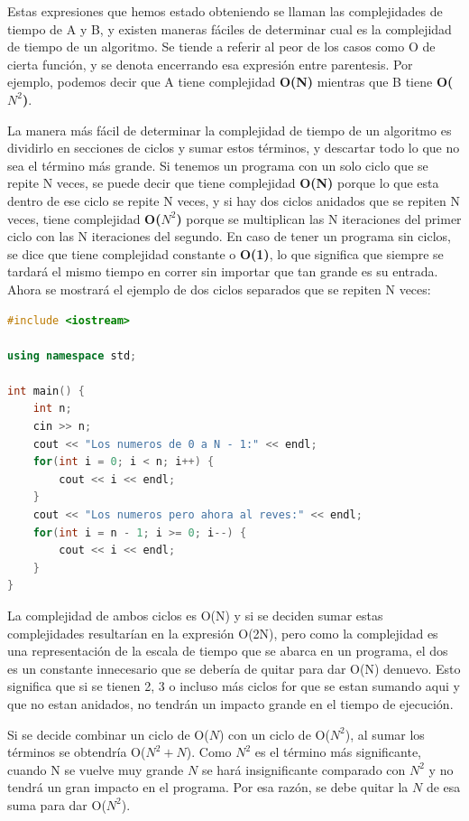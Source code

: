 \documentclass{article}
\begin{document}
Estas expresiones que hemos estado obteniendo se llaman las complejidades de tiempo de A y B, y existen maneras fáciles de determinar cual es la complejidad de tiempo de un algoritmo. Se tiende a referir al peor de los casos como O de cierta función, y se denota encerrando esa expresión entre parentesis. Por ejemplo, podemos decir que A tiene complejidad \textbf{O(N)} mientras que B tiene \textbf{O($N^2$)}.

La manera más fácil de determinar la complejidad de tiempo de un algoritmo es dividirlo en secciones de ciclos y sumar estos términos, y descartar todo lo que no sea el término más grande. Si tenemos un programa con un solo ciclo que se repite N veces, se puede decir que tiene complejidad \textbf{O(N)} porque lo que esta dentro de ese ciclo se repite N veces, y si hay dos ciclos anidados que se repiten N veces, tiene complejidad \textbf{O($N^2$)} porque se multiplican las N iteraciones del primer ciclo con las N iteraciones del segundo. En caso de tener un programa sin ciclos, se dice que tiene complejidad constante o \textbf{O(1)}, lo que significa que siempre se tardará el mismo tiempo en correr sin importar que tan grande es su entrada. Ahora se mostrará el ejemplo de dos ciclos separados que se repiten N veces:

\begin{lstlisting}[language=C++, title=Encontrando primos menores que N]
#include <iostream>

using namespace std;

int main() {
	int n;
	cin >> n;
	cout << "Los numeros de 0 a N - 1:" << endl;
	for(int i = 0; i < n; i++) {
		cout << i << endl;
	}
	cout << "Los numeros pero ahora al reves:" << endl;
	for(int i = n - 1; i >= 0; i--) {
		cout << i << endl;
	}
}
\end{lstlisting}

La complejidad de ambos ciclos es O(N) y si se deciden sumar estas complejidades resultarían en la expresión O(2N), pero como la complejidad es una representación de la escala de tiempo que se abarca en un programa, el dos es un constante innecesario que se debería de quitar para dar O(N) denuevo. Esto significa que si se tienen 2, 3 o incluso más ciclos for que se estan sumando aqui y que no estan anidados, no tendrán un impacto grande en el tiempo de ejecución.

Si se decide combinar un ciclo de O($N$) con un ciclo de O($N^2$), al sumar los términos se obtendría O($N^2 + N$). Como $N^2$ es el término más significante, cuando N se vuelve muy grande $N$ se hará insignificante comparado con $N^2$ y no tendrá un gran impacto en el programa. Por esa razón, se debe quitar la $N$ de esa suma para dar O($N^2$).
\end{document}

